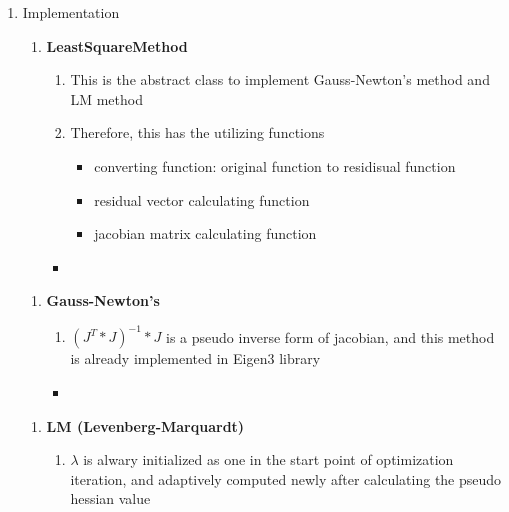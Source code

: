 \documentclass{standalone}
\begin{document}
\begin{enumerate}
  \item Implementation
  \begin{enumerate} %
    \item \textbf{LeastSquareMethod}
    \begin{enumerate}
      \item This is the abstract class to implement Gauss-Newton's method and LM method
      \item Therefore, this has the utilizing functions
      \begin{itemize}
        \item converting function: original function to residisual function
        \item residual vector calculating function
        \item jacobian matrix calculating function
      \end{itemize}
    \end{enumerate}

    \begin{itemize}[label=\quad,leftmargin=-5em]
      \item {}
    \end{itemize}
  \end{enumerate}
  \begin{enumerate} %
    \item \textbf{Gauss-Newton's}
    \begin{enumerate}
      \item $(J^T*J)^{-1}*J$ is a pseudo inverse form of jacobian, and this method is already implemented in Eigen3 library
    \end{enumerate}
    
    \begin{itemize}[label=\quad,leftmargin=-5em]
      \item {}
    \end{itemize}
    \end{enumerate}

  \newpage \begin{enumerate} %
    \item \textbf{LM (Levenberg-Marquardt)}
    \begin{enumerate}
      \item $\lambda$ is alwary initialized as one in the start point of optimization iteration, 
      and adaptively computed newly after calculating the pseudo hessian value
    \end{enumerate}
    

\end{enumerate}
\end{enumerate}
\end{document}
